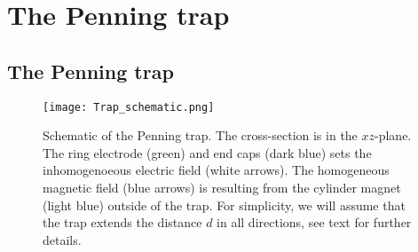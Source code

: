 \section{The Penning trap}\label{sec:penning_trap}

\subsection{The Penning trap}\label{subsec_methods:penning_trap_setup}

\begin{figure}[h!]
    \texttt{[image: Trap\_schematic.png]}
    \caption{Schematic of the Penning trap. The cross-section is in the $xz$-plane. The ring electrode (green) and end caps (dark blue) sets the inhomogenoeous electric field (white arrows). The homogeneous magnetic field (blue arrows) is resulting from the cylinder magnet (light blue) outside of the trap. For simplicity, we will assume that the trap extends the distance $d$ in all directions, see text for further details.}
    \label{fig:schematic_trap}
\end{figure}

